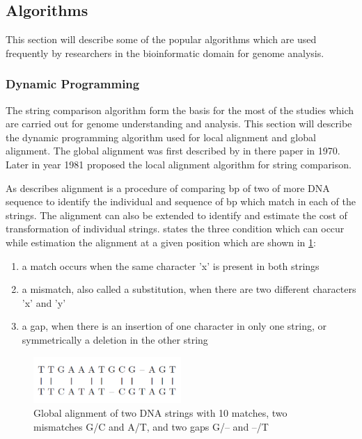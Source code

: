 \documentclass[12pt,twoside]{article}
\begin{document}
\subsection{Algorithms}

This section will describe some of the popular algorithms which are used frequently by researchers in the bioinformatic
domain for genome analysis.

\subsubsection{Dynamic Programming}
\label{dp}

The string comparison algorithm form the basis for the most of the studies which are carried out for
genome understanding and analysis. This section will describe the dynamic programming algorithm
used for local alignment and global alignment. The global alignment was first described by \textcite{needleman_general_1970}
in there paper in 1970. Later in year 1981 \textcite{smith_identification_1981} proposed the local alignment algorithm
for string comparison.

As \textcite[Chapter 3]{mount_bioinformatics:_2004} describes alignment is a procedure of comparing bp of two of more DNA sequence
to identify the individual and sequence of bp which match in each of the strings. The alignment can also be extended to
identify and estimate the cost of transformation of individual strings. \cite{gokhale_reconfigurable_2010} states the three
condition which can occur while estimation the alignment at a given position which are shown in \cref{fig:alignment}:

\begin{enumerate}
	\item a match occurs when the same character 'x' is present in both strings
	\item a mismatch, also called a substitution, when there are two different characters 'x' and 'y'
	\item a gap, when there is an insertion of one character in only one string, or symmetrically a deletion in the other string
\end{enumerate}

\begin{figure}%
    \centering
    \includegraphics[width=0.5\textwidth]{fig/alignment}
    \caption{Global alignment of two DNA strings with 10 matches, two mismatches
	G/C and A/T, and two gaps G/– and –/T \cite[Figure 8.2]{gokhale_reconfigurable_2010}}
    \label{fig:alignment}
\end{figure}
\end{document}

